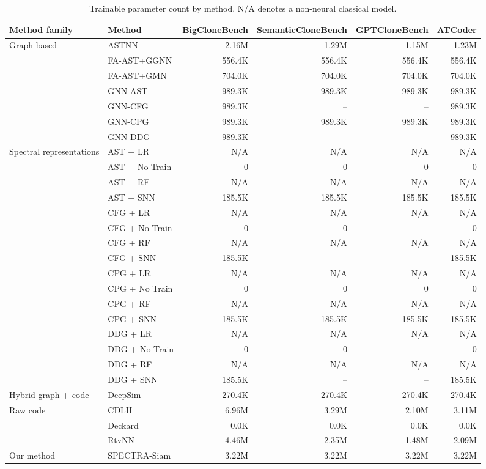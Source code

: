 \documentclass[10pt]{article}
\begin{document}
\begin{table}[p]
\centering
\small
\caption{Trainable parameter count by method. N/A denotes a non-neural classical model.}
\label{tab:parameters}
\begin{tabular}{llrrrr}
\toprule
Method family & Method & BigCloneBench & SemanticCloneBench & GPTCloneBench & ATCoder \\
\midrule
\multirow{7}{*}{Graph-based} & ASTNN & 2.16M & 1.29M & 1.15M & 1.23M \\
 & FA-AST+GGNN & 556.4K & 556.4K & 556.4K & 556.4K \\
 & FA-AST+GMN & 704.0K & 704.0K & 704.0K & 704.0K \\
 & GNN-AST & 989.3K & 989.3K & 989.3K & 989.3K \\
 & GNN-CFG & 989.3K & -- & -- & 989.3K \\
 & GNN-CPG & 989.3K & 989.3K & 989.3K & 989.3K \\
 & GNN-DDG & 989.3K & -- & -- & 989.3K \\
\midrule
\multirow{16}{*}{Spectral representations} & AST + LR & N/A & N/A & N/A & N/A \\
 & AST + No Train & 0 & 0 & 0 & 0 \\
 & AST + RF & N/A & N/A & N/A & N/A \\
 & AST + SNN & 185.5K & 185.5K & 185.5K & 185.5K \\
 & CFG + LR & N/A & N/A & N/A & N/A \\
 & CFG + No Train & 0 & 0 & -- & 0 \\
 & CFG + RF & N/A & N/A & N/A & N/A \\
 & CFG + SNN & 185.5K & -- & -- & 185.5K \\
 & CPG + LR & N/A & N/A & N/A & N/A \\
 & CPG + No Train & 0 & 0 & 0 & 0 \\
 & CPG + RF & N/A & N/A & N/A & N/A \\
 & CPG + SNN & 185.5K & 185.5K & 185.5K & 185.5K \\
 & DDG + LR & N/A & N/A & N/A & N/A \\
 & DDG + No Train & 0 & 0 & -- & 0 \\
 & DDG + RF & N/A & N/A & N/A & N/A \\
 & DDG + SNN & 185.5K & -- & -- & 185.5K \\
\midrule
\multirow{1}{*}{Hybrid graph + code} & DeepSim & 270.4K & 270.4K & 270.4K & 270.4K \\
\midrule
\multirow{3}{*}{Raw code} & CDLH & 6.96M & 3.29M & 2.10M & 3.11M \\
 & Deckard & 0.0K & 0.0K & 0.0K & 0.0K \\
 & RtvNN & 4.46M & 2.35M & 1.48M & 2.09M \\
\midrule
\multirow{1}{*}{Our method} & SPECTRA-Siam & 3.22M & 3.22M & 3.22M & 3.22M \\
\bottomrule
\end{tabular}
\end{table}
\clearpage
\end{document}
